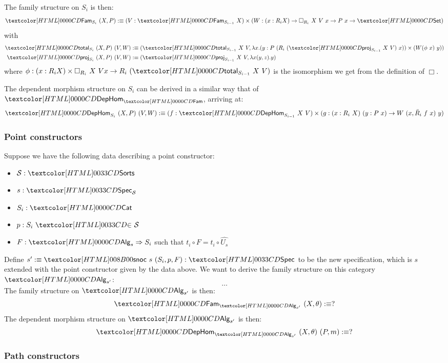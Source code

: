 The family structure on $S_i$ is then:
$$
  \Fam_{S_i}\ (X , P) \ddefeq (V : \Fam_{S_{i-1}} X) \times (W : (x : R_i X) \to \Box_{R_i}\ X\ V\ x \to P\ x \to \Set)
$$
with
%
\begin{align*}
  \total_{S_i}\ (X , P)\ (V , W) &\ddefeq (\total_{S_{i-1}}\ X\ V, \lambda x . (y : P\ (R_i\ (\proj_{S_{i-1}}\ X\ V)\ x)) \times (W (\phi\ x)\ y)) \\
  \proj_{S_i}\ (X, P)\ (V, W) &\ddefeq (\proj_{S_{i-1}}\ X\ V, \lambda x (y , z) . y)
\end{align*}
%
where
$\phi : (x : R_i X) \times \Box_{R_i}\ X\ V x \to R_i\
(\total_{S_{i-1}}\ X\ V)$
is the isomorphism we get from the definition of $\Box$.

The dependent morphism structure on $S_i$ can be derived in a similar
way that of $\DepHom_{\Fam}$, arriving at:
$$
  \DepHom_{S_i}\ (X , P)\ (V , W) \ddefeq (f : \DepHom_{S_{i-1}}\ X\ V) \times (g : (x : R_i\ X)\ (y : P\ x) \to W\ (x , \bar{R}_i\ f\ x)\ y)\\
$$

\subsubsection{Point constructors}

Suppose we have the following data describing a point constructor:
%
\begin{itemize}
\item $\Ss : \sortsty$
\item $s : \specty_{\Ss}$
\item $S_i : \Cat$
\item $p : \sortsin{S_i}{\Ss}$
\item $F : \Func{\Alg_s}{S_i}$ such that $t_i \circ F = t_i \circ \hat{U_s}$
\end{itemize}

Define $s' \ddefeq \specsnoc\ s\ (S_i,p,F) : \specty$ to be the new
specification, which is $s$ extended with the point constructor given by
the data above. We want to derive the family structure on this
category $\Alg_{s'}$:
$$
\hdots
$$
The family structure on $\Alg_{s'}$ is then:
$$
  \Fam_{\Alg_{s'}}\ (X , \theta) \ddefeq ? \\
$$
The dependent morphism structure on $\Alg_{s'}$ is then:
$$  
\DepHom_{\Alg_{s'}}\ (X , \theta)\ (P , m) \ddefeq ?
$$

\subsubsection{Path constructors}

